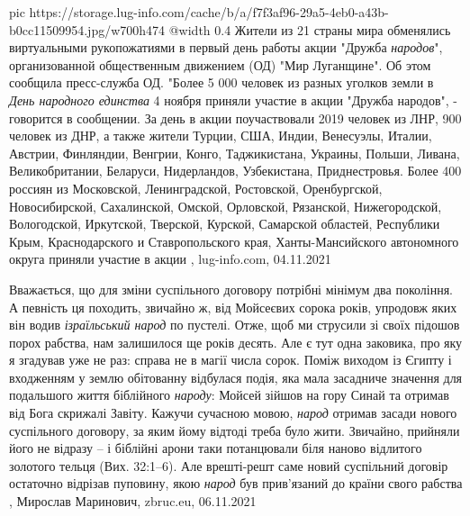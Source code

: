 \ifcmt
  pic https://storage.lug-info.com/cache/b/a/f7f3af96-29a5-4eb0-a43b-b0cc11509954.jpg/w700h474
  @width 0.4
\fi
Жители из 21 страны мира обменялись виртуальными рукопожатиями в первый день
работы акции "Дружба \emph{народов}", организованной общественным движением (ОД) "Мир
Луганщине". Об этом сообщила пресс-служба ОД.  "Более 5 000 человек из разных
уголков земли в \emph{День народного единства} 4 ноября приняли участие в акции
"Дружба народов", - говорится в сообщении.  За день в акции поучаствовали 2019
человек из ЛНР, 900 человек из ДНР, а также жители Турции, США, Индии,
Венесуэлы, Италии, Австрии, Финляндии, Венгрии, Конго, Таджикистана, Украины,
Польши, Ливана, Великобритании, Беларуси, Нидерландов, Узбекистана,
Приднестровья.  Более 400 россиян из Московской, Ленинградской, Ростовской,
Оренбургской, Новосибирской, Сахалинской, Омской, Орловской, Рязанской,
Нижегородской, Вологодской, Иркутской, Тверской, Курской, Самарской областей,
Республики Крым, Краснодарского и Ставропольского края, Ханты-Мансийского
автономного округа приняли участие в акции
, 
lug-info.com, 04.11.2021

Вважається, що для зміни суспільного договору потрібні мінімум два покоління. А
певність ця походить, звичайно ж, від Мойсеєвих сорока років, упродовж яких він
водив \emph{ізраїльський народ} по пустелі. Отже, щоб ми струсили зі своїх підошов
порох рабства, нам залишилося ще років десять. Але є тут одна заковика, про яку
я згадував уже не раз: справа не в магії числа сорок. Поміж виходом із Єгипту і
входженням у землю обітованну відбулася подія, яка мала засадниче значення для
подальшого життя біблійного \emph{народу}: Мойсей зійшов на гору Синай та отримав від
Бога скрижалі Завіту. Кажучи сучасною мовою, \emph{народ} отримав засади нового
суспільного договору, за яким йому відтоді треба було жити. Звичайно, прийняли
його не відразу – і біблійні арони таки потанцювали біля наново відлитого
золотого тельця (Вих. 32:1–6). Але врешті-решт саме новий суспільний договір
остаточно відрізав пуповину, якою \emph{народ} був прив’язаний до країни свого рабства
, 
Мирослав Маринович, zbruc.eu, 06.11.2021

